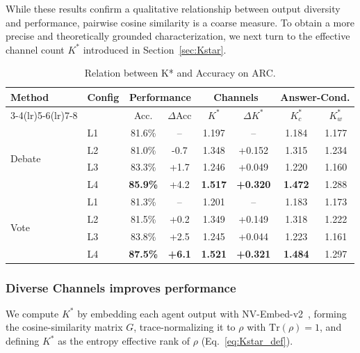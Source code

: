 \documentclass{article}
\theoremstyle{plain}
\theoremstyle{definition}
\theoremstyle{remark}
\begin{document}
While these results confirm a qualitative relationship between output diversity and performance, pairwise cosine similarity is a coarse measure. To obtain a more precise and theoretically grounded characterization, we next turn to the effective channel count $K^*$ introduced in Section~\ref{sec:Kstar}.




\begin{table}[t]
\centering
\caption{Relation between K* and Accuracy on ARC.}
\vspace{-0.2cm}
\label{tab:arc-Kstar}
\scriptsize
\renewcommand{\arraystretch}{1.2}
\setlength{\tabcolsep}{4.5pt}
\begin{tabular}{ll|cc|cc|cc}
\toprule
\multirow{2}{*}{Method} & \multirow{2}{*}{Config}
& \multicolumn{2}{c|}{\textbf{Performance}}
& \multicolumn{2}{c|}{\textbf{Channels}}
& \multicolumn{2}{c}{\textbf{Answer-Cond.}} \\
\cmidrule(lr){3-4}\cmidrule(lr){5-6}\cmidrule(lr){7-8}
& & Acc. & $\Delta$Acc
& $K^*$ & $\Delta K^*$
& $K^*_c$ & $K^*_w$ \\
\midrule
\multirow{4}{*}{Debate}
& L1 & 81.6\% & --   & 1.197 & --     & 1.184 & 1.177\\
& L2 & 81.0\% & -0.7 & 1.348 & +0.152 & 1.315 & 1.234 \\
& L3 & 83.3\% & +1.7 & 1.246 & +0.049 & 1.220 & 1.160 \\
& L4 & \textbf{85.9\%} & +4.2 & \textbf{1.517} & \textbf{+0.320} & \textbf{1.472} & 1.288  \\
\midrule
\multirow{4}{*}{Vote}
& L1 & 81.3\% & --   & 1.201 & --     & 1.183 & 1.173\\
& L2 & 81.5\% & +0.2 & 1.349 & +0.149 & 1.318 & 1.222 \\
& L3 & 83.8\% & +2.5 & 1.245 & +0.044 & 1.223 & 1.161 \\
& L4 & \textbf{87.5\%} & \textbf{+6.1} & \textbf{1.521} & \textbf{+0.321} & \textbf{1.484} & 1.297 \\
\bottomrule
\end{tabular}
\vspace{-0.5cm}
\end{table}


\subsubsection{Diverse Channels improves performance}
\label{sec:kstar_analysis}

We compute \(K^*\) by embedding each agent output with NV-Embed-v2~\citep{lee2025nvembedimprovedtechniquestraining}, forming the cosine-similarity matrix \(G\), trace-normalizing it to \(\rho\) with \(\mathrm{Tr}(\rho) = 1\), and defining \(K^*\) as the entropy effective rank of \(\rho\) (Eq.~\ref{eq:Kstar_def}).
\end{document}
